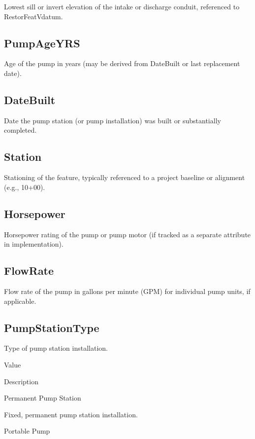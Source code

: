 \documentclass[
  letterpaper,
  DIV=11,
  numbers=noendperiod]{scrreprt}
\begin{document}
Lowest sill or invert elevation of the intake or discharge conduit,
referenced to RestorFeatVdatum.

\subsection{PumpAgeYRS}\label{pumpageyrs-1}

Age of the pump in years (may be derived from DateBuilt or last
replacement date).

\subsection{DateBuilt}\label{datebuilt-1}

Date the pump station (or pump installation) was built or substantially
completed.

\subsection{Station}\label{station-2}

Stationing of the feature, typically referenced to a project baseline or
alignment (e.g., 10+00).

\subsection{Horsepower}\label{horsepower-1}

Horsepower rating of the pump or pump motor (if tracked as a separate
attribute in implementation).

\subsection{FlowRate}\label{flowrate-1}

Flow rate of the pump in gallons per minute (GPM) for individual pump
units, if applicable.

\subsection{PumpStationType}\label{pumpstationtype-1}

Type of pump station installation.

Value

Description

Permanent Pump Station

Fixed, permanent pump station installation.

Portable Pump
\end{document}
